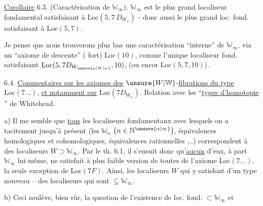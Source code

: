 \uline{Corollaire} 6.3. (Caractérisation de $\mathbb W_\infty$). $\mathbb W_\infty$ est le plus grand localiseur fondamental satisfaisant à $\mathrm{Loc}(5,7\,D_{W_\omega})$ - donc aussi le plus grand loc. fond. satisfaisant à $\mathrm{Loc}(5,7)$.

Je pense que nous trouverons plus bas une caractérisation ``interne'' de $\mathbb W_\infty$, via un ``axiome de descente'' (  fort) $\mathrm{Loc}(10)$,
comme l'unique localiseur fond. satisfaisant $\mathrm{Loc}(5,7D_{W_{\unsure{\omega|W|w}}},10)$, (ou encor $\mathrm{Loc}(5,7,10)$).

6.4. \uline{Commentaires sur les axiomes des} $\unsure{W|\mathbb W}$-\uline{fibrations du type} $\mathrm{Loc}(7\ldots)$, \uline{et notamment sur} $\mathrm{Loc}(7D_{W_\omega})$. Relation  avec les ``\uline{types d'homotopie }'' de Whitehead.

a) Il me semble que \uline{tous} les localiseurs fondamentaux avec lesquels on a  tacitement jusqu'à présent (les $\mathbb W_n$ $\bigl(n\in\mathbb N^{\unsure{\alpha|\infty}}\bigr)$, équivalences homologiques et cohomologiques, équivalences rationnelles $\ldots$) correspondent à des localiseurs $W\supset\mathbb W_\infty$. Par le th. 6.1, il s'ensuit donc qu'\uline{aucun} d'eux, à part $\mathbb W_\infty$ lui-même, ne satisfait à  plus faible version  de toutes de l'axiome $\mathrm{Loc}(7\ldots)$,   la seule  exception de $\mathrm{Loc}(7F)$. Ainsi, les localiseurs $W$ qui y satisfont     d'un type  nouveau -- des localiseurs qui sont $\subsetneq\mathbb W_\infty$.

b) Ceci soulève, bien sûr, la question de l'existence de loc. fond. $\subset\mathbb W_\infty$ et

